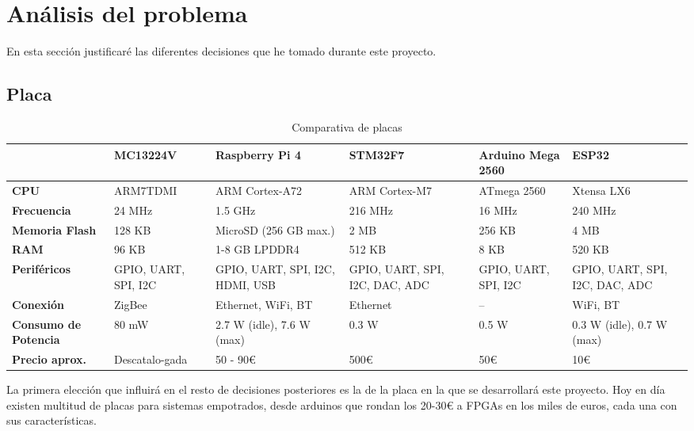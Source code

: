 \chapter{Análisis del problema}

En esta sección justificaré las diferentes decisiones que he tomado durante este proyecto.

\section{Placa}

\begin{table}[h]
\centering
\renewcommand{\arraystretch}{1.2}
\begin{tabularx}{\textwidth}{|X|X|X|X|X|X|}
\hline
\textbf{} 			& \textbf{MC13224V} 	& \textbf{Raspberry Pi 4}	    & \textbf{STM32F7}			& \textbf{Arduino Mega 2560}    & \textbf{ESP32} 		 \\ \hline
\textbf{CPU} 			& ARM7TDMI 		& ARM Cortex-A72		    & ARM Cortex-M7   		    	& ATmega 2560			& Xtensa LX6 			 \\ \hline
\textbf{Frecuencia} 		& 24 MHz 		& 1.5 GHz			    & 216 MHz 	  		    	& 16 MHz		    	& 240 MHz			 \\ \hline
\textbf{Memoria Flash} 		& 128 KB 		& MicroSD (256 GB max.)		    & 2 MB 		  	    	& 256 KB 		    	& 4 MB				 \\ \hline
\textbf{RAM} 			& 96 KB 		& 1-8 GB LPDDR4 		    & 512 KB 	  		    	& 8 KB 			    	& 520 KB 			 \\ \hline
\textbf{Periféricos} 		& GPIO, UART, SPI, I2C 	& GPIO, UART, SPI, I2C, HDMI, USB   & GPIO, UART, SPI, I2C, DAC, ADC	& GPIO, UART, SPI, I2C 	    	& GPIO, UART, SPI, I2C, DAC, ADC \\ \hline
\textbf{Conexión} 		& ZigBee 		& Ethernet, WiFi, BT		    & Ethernet				& -- 			    	& WiFi, BT			 \\ \hline
\textbf{Consumo de Potencia} 	& 80 mW 		& 2.7 W (idle), 7.6 W (max) 	    & 0.3 W				& 0.5 W 		    	& 0.3 W (idle), 0.7 W (max) 	 \\ \hline
\textbf{Precio aprox.} 		& Descatalo-gada 	& 50 - 90€ 			    & 500€ 				& 50€			    	& 10€				 \\ \hline
\end{tabularx}
\caption{Comparativa de placas}
\label{Tab:placas}
\end{table}

La primera elección que influirá en el resto de decisiones posteriores es la de la placa en la que se desarrollará este proyecto. Hoy en día existen multitud de placas para sistemas empotrados, desde arduinos que rondan los 20-30€ a FPGAs en los miles de euros, cada una con sus características.

